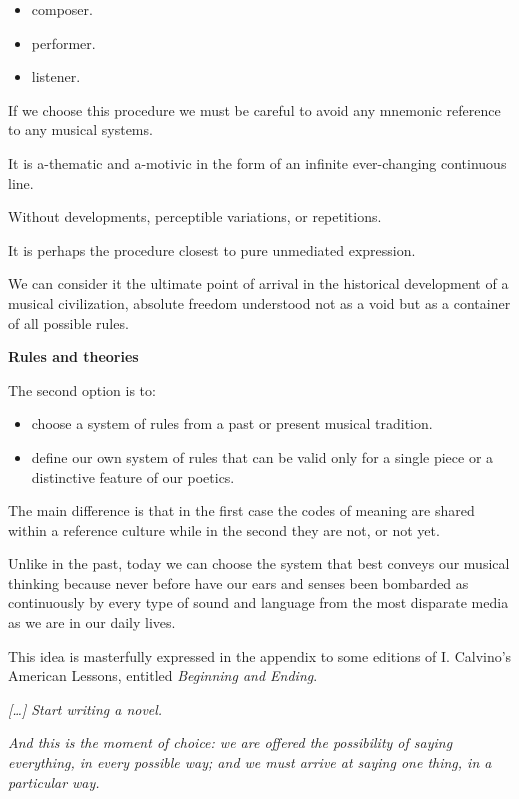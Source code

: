 \begin{itemize}
\tightlist
\item composer. 
\item performer. 
\item listener.
\end{itemize}

If we choose this procedure we must be careful to avoid any mnemonic reference to any musical systems.

It is a-thematic and a-motivic in the form of an infinite ever-changing continuous line.

Without developments, perceptible variations, or repetitions.

It is perhaps the procedure closest to pure unmediated expression.

We can consider it the ultimate point of arrival in the historical development of a musical civilization, absolute freedom understood not as a void but as a container of all possible rules.

\textbf{Rules and theories}\label{rules-and-theories}

The second option is to:

\begin{itemize}
\tightlist
\item choose a system of rules from a past or present musical tradition.
\item define our own system of rules that can be valid only for a single piece or a distinctive feature of our poetics.
\end{itemize}

The main difference is that in the first case the codes of meaning are shared within a reference culture while in the second they are not, or not yet.

Unlike in the past, today we can choose the system that best conveys our musical thinking because never before have our ears and senses been bombarded as continuously by every type of sound and language from the most disparate media as we are in our daily lives.

This idea is masterfully expressed in the appendix to some editions of I. Calvino's American Lessons, entitled \textit{Beginning and Ending}.

\textit{  {[}\ldots{]} Start writing a novel. }

\textit{And this is the moment of choice: we are offered the possibility of saying everything, in every possible way; and we must arrive at saying one thing, in a particular way.}

